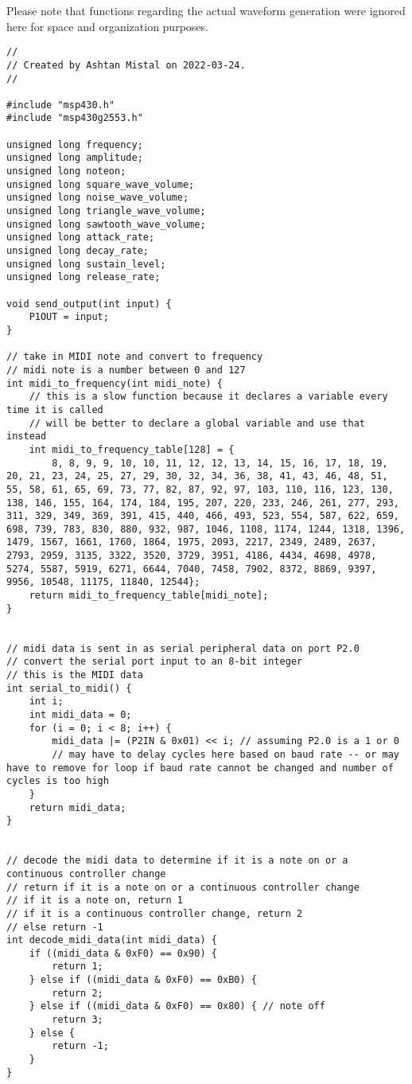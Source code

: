 Please note that functions regarding the actual waveform generation were ignored here for space and organization purposes. 

\begin{lstlisting}[label={lst:lstlisting}]
//
// Created by Ashtan Mistal on 2022-03-24.
//

#include "msp430.h"
#include "msp430g2553.h"

unsigned long frequency;
unsigned long amplitude;
unsigned long noteon;
unsigned long square_wave_volume;
unsigned long noise_wave_volume;
unsigned long triangle_wave_volume;
unsigned long sawtooth_wave_volume;
unsigned long attack_rate;
unsigned long decay_rate;
unsigned long sustain_level;
unsigned long release_rate;

void send_output(int input) {
    P1OUT = input;
}

// take in MIDI note and convert to frequency
// midi note is a number between 0 and 127
int midi_to_frequency(int midi_note) {
    // this is a slow function because it declares a variable every time it is called
    // will be better to declare a global variable and use that instead
    int midi_to_frequency_table[128] = {
        8, 8, 9, 9, 10, 10, 11, 12, 12, 13, 14, 15, 16, 17, 18, 19, 20, 21, 23, 24, 25, 27, 29, 30, 32, 34, 36, 38, 41, 43, 46, 48, 51, 55, 58, 61, 65, 69, 73, 77, 82, 87, 92, 97, 103, 110, 116, 123, 130, 138, 146, 155, 164, 174, 184, 195, 207, 220, 233, 246, 261, 277, 293, 311, 329, 349, 369, 391, 415, 440, 466, 493, 523, 554, 587, 622, 659, 698, 739, 783, 830, 880, 932, 987, 1046, 1108, 1174, 1244, 1318, 1396, 1479, 1567, 1661, 1760, 1864, 1975, 2093, 2217, 2349, 2489, 2637, 2793, 2959, 3135, 3322, 3520, 3729, 3951, 4186, 4434, 4698, 4978, 5274, 5587, 5919, 6271, 6644, 7040, 7458, 7902, 8372, 8869, 9397, 9956, 10548, 11175, 11840, 12544};
    return midi_to_frequency_table[midi_note];
}


// midi data is sent in as serial peripheral data on port P2.0
// convert the serial port input to an 8-bit integer
// this is the MIDI data
int serial_to_midi() {
    int i;
    int midi_data = 0;
    for (i = 0; i < 8; i++) {
        midi_data |= (P2IN & 0x01) << i; // assuming P2.0 is a 1 or 0
        // may have to delay cycles here based on baud rate -- or may have to remove for loop if baud rate cannot be changed and number of cycles is too high
    }
    return midi_data;
}


// decode the midi data to determine if it is a note on or a continuous controller change
// return if it is a note on or a continuous controller change
// if it is a note on, return 1
// if it is a continuous controller change, return 2
// else return -1
int decode_midi_data(int midi_data) {
    if ((midi_data & 0xF0) == 0x90) {
        return 1;
    } else if ((midi_data & 0xF0) == 0xB0) {
        return 2;
    } else if ((midi_data & 0xF0) == 0x80) { // note off
        return 3;
    } else {
        return -1;
    }
}


\end{lstlisting}
